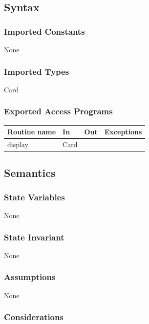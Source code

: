 \documentclass[12pt, titlepage]{article}
\begin{document}
\subsection* {Syntax}

\subsubsection* {Imported Constants}

None

\subsubsection* {Imported Types}

Card

\subsubsection* {Exported Access Programs}

\begin{tabular}{| l | l | l | p{5cm} |}
\hline
\textbf{Routine name} & \textbf{In} & \textbf{Out} & \textbf{Exceptions}\\
\hline
display & Card & &\\
\hline  
\end{tabular}

\subsection* {Semantics}

\subsubsection* {State Variables}

None

\subsubsection* {State Invariant}

None

\subsubsection* {Assumptions}

None

\subsubsection* {Considerations}
\end{document}
